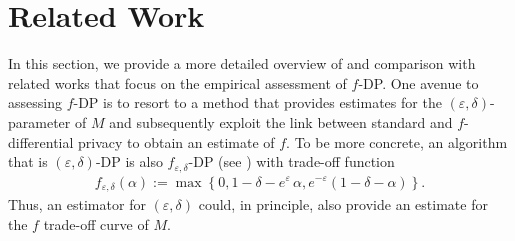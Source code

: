 
\section{Related Work} \label{sec:relatedwork}





In this section, we provide a more detailed overview of and comparison with related works that focus on the empirical assessment of $f$-DP. One avenue to assessing $f$-DP is to resort to a method that provides estimates for the $(\varepsilon,\delta)$-parameter of $M$ and subsequently exploit the link between standard and $f$-differential privacy to obtain an estimate of $f$. To be more concrete, an algorithm that is $(\varepsilon,\delta)$-DP is also $f_{\varepsilon, \delta}$-DP (see \cite{Dong2022}) with trade-off function 
\begin{align} \label{f_epsilon_delta}
    f_{\varepsilon, \delta}(\alpha) := \max \left\{ 0, 1 - \delta - e^{\varepsilon} \, \alpha, e^{- \varepsilon} (1 -\delta - \alpha) \right\}.
\end{align} 
Thus, an estimator for $(\varepsilon, \delta)$ could, in principle, also provide an estimate for the $f$ trade-off curve of $M$. 

